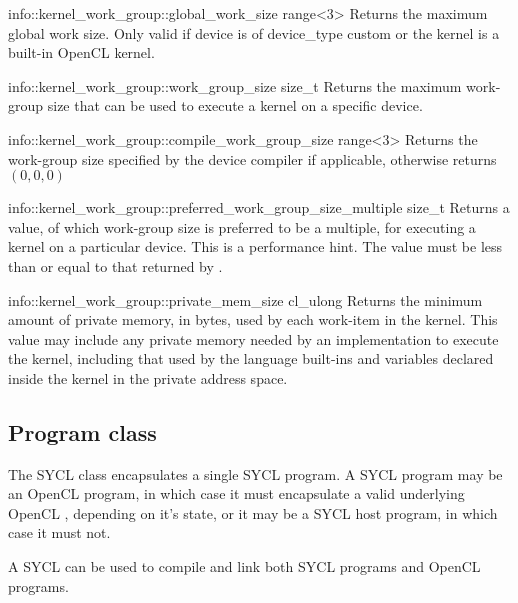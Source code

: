 \addInfoRow
{info::kernel_work_group::global_work_size}
{range<3>}
{Returns the maximum global work size. Only valid if device is of device_type 
 custom or the kernel is a built-in OpenCL kernel.}

\addInfoRow
{info::kernel_work_group::work_group_size}
{size_t}
{Returns the maximum work-group size that can be used to execute 
  a kernel on a specific device. }

\addInfoRow
{info::kernel_work_group::compile_work_group_size}
{range<3>}
{Returns the work-group size specified by the device compiler if applicable, 
  otherwise returns $(0,0,0)$}

\addInfoRow
{info::kernel_work_group::preferred_work_group_size_multiple}
{size_t}
{
  Returns a value, of which work-group size is preferred to be a multiple,
  for executing a kernel on a particular device.  This is a performance
  hint.  The value must be less than or equal to that returned by
  .
}

\addInfoRow
{info::kernel_work_group::private_mem_size}
{cl_ulong}
{
  Returns the minimum amount of private memory, in bytes, used by each work-item
  in the kernel. This value may include any private memory needed by an 
  implementation to execute the kernel, including that used by the language
  built-ins and variables declared inside the kernel in the private address
  space.
}

\completeInfoTable


\subsection{Program class}
\label{sec:interfaces.program.class}

The SYCL  class encapsulates a single SYCL program. A SYCL program may be an OpenCL program, in which case it must encapsulate a valid underlying OpenCL , depending on it's state, or it may be a SYCL host program, in which case it must not.

A SYCL  can be used to compile and link both SYCL programs and OpenCL programs.

